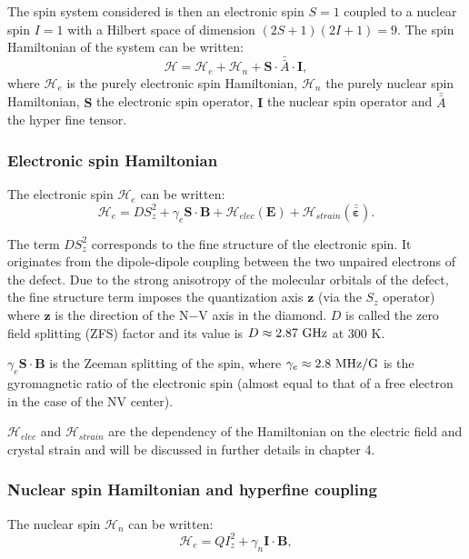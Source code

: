 \documentclass[a4paper, 11pt]{book}
\begin{document}
The spin system considered is then an electronic spin $S=1$ coupled to a nuclear spin $I=1$ with a Hilbert space of dimension $(2S+1)(2I+1)=9$. The spin Hamiltonian of the system can be written:
\begin{equation}
\mathcal{H}=\mathcal{H}_e + \mathcal{H}_n + \mathbf{S}\cdot \bar{\bar{A}}\cdot \mathbf{I},
\end{equation}
where $\mathcal{H}_e$ is the purely electronic spin Hamiltonian, $\mathcal{H}_n$ the purely nuclear spin Hamiltonian, $\mathbf{S}$ the electronic spin operator, $\mathbf{I}$ the nuclear spin operator and $\bar{\bar{A}}$ the hyper fine tensor.
\subsubsection{Electronic spin Hamiltonian}
The electronic spin $\mathcal{H}_e$ can be written:
\begin{equation}
\label{eq. spin elec}
\mathcal{H}_e=D S_z^2 + \gamma_e \mathbf{S} \cdot \mathbf{B} + \mathcal{H}_{elec}(\mathbf{E})+ \mathcal{H}_{strain}(\mathbf{\bar{\bar{\varepsilon}}}).
\end{equation}

The term $D S_z^2$ corresponds to the fine structure of the electronic spin. It originates from the dipole-dipole coupling between the two unpaired electrons of the defect. Due to the strong anisotropy of the molecular orbitals of the defect, the fine structure term imposes the quantization axis $\mathbf{z}$ (via the $S_z$ operator) where $\mathbf{z}$ is the direction of the N$-$V axis in the diamond. $D$ is called the zero field splitting (ZFS) factor and its value is $D\approx 2.87\ \rm GHz$ at 300 K.

$\gamma_e \mathbf{S} \cdot \mathbf{B}$ is the Zeeman splitting of the spin, where $\gamma_e \approx 2.8\ \rm MHz/G$ is the gyromagnetic ratio of the electronic spin (almost equal to that of a free electron in the case of the NV center).

$\mathcal{H}_{elec}$ and $\mathcal{H}_{strain}$ are the dependency of the Hamiltonian on the electric field and crystal strain and will be discussed in further details in chapter 4.

\subsubsection{Nuclear spin Hamiltonian and hyperfine coupling}
The nuclear spin $\mathcal{H}_n$ can be written:
\begin{equation}
\mathcal{H}_e=Q I_z^2 + \gamma_n \mathbf{I} \cdot \mathbf{B},
\end{equation}
\end{document}
